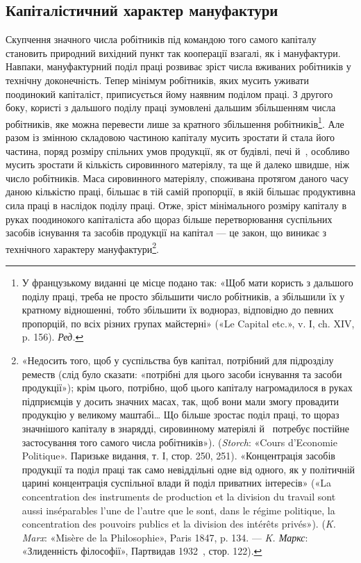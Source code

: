 \subsection{Капіталістичний характер мануфактури}

Скупчення значного числа робітників під командою того
самого капіталу становить природний вихідний пункт так кооперації
взагалі, як і мануфактури. Навпаки, мануфактурний поділ
праці розвиває зріст числа вживаних робітників у технічну
доконечність. Тепер мінімум робітників, яких мусить уживати
поодинокий капіталіст, приписується йому наявним поділом
праці. З другого боку, користі з дальшого поділу праці зумовлені
дальшим збільшенням числа робітників, яке можна перевести
лише за кратного збільшення робітників\footnote*{
У французькому виданні це місце подано так: «Щоб мати користь
з дальшого поділу праці, треба не просто збільшити число робітників, а
збільшили їх у кратному відношенні, тобто збільшити їх воднораз,
відповідно до певних пропорцій, по всіх різних групах майстерні» («Le
Capital etc.», v. І, ch. XIV, p. 156). \emph{Ред.}
}. Але разом із
змінною складовою частиною капіталу мусить зростати й стала
його частина, поряд розміру спільних умов продукції, як от
будівлі, печі й~, особливо мусить зростати й кількість сировинного
матеріялу, та ще й далеко швидше, ніж число робітників.
Маса сировинного матеріялу, споживана протягом даного
часу даною кількістю праці, більшає в тій самій пропорції, в
якій більшає продуктивна сила праці в наслідок поділу праці.
Отже, зріст мінімального розміру капіталу в руках поодинокого
капіталіста або щораз більше перетворювання суспільних засобів
існування та засобів продукції на капітал — це закон, що
виникає з технічного характеру мануфактури\footnote{
«Недосить того, щоб у суспільства був капітал, потрібний для
підрозділу реместв (слід було сказати: «потрібні для цього засоби
існування та засоби продукції»); крім цього, потрібно, щоб цього капіталу
нагромадилося в руках підприємців у досить значних масах, так, щоб
вони мали змогу провадити продукцію у великому маштабі\dots{} Що більше
зростає поділ праці, то щораз значнішого капіталу в знарядді,
сировинному матеріялі й~ потребує постійне застосування того самого числа
робітників»). (\emph{Storch}: «Cours d’Economie Politique». Паризьке видання,
т. І, стор. 250, 251). «Концентрація засобів продукції та поділ
праці так само невіддільні одне від одного, як у політичній царині
концентрація суспільної влади й поділ приватних інтересів» («La
concentration des instruments de production et la division du travail sont aussi
inséparables l’une de l’autre que le sont, dans le régime politique, la
concentration des pouvoirs publics et la division des intérêts privés»).
(\emph{K. Marx}: «Misère de la Philosophie», Paris 1847, p. 134. — \emph{K. Маркс}:
«Злиденність філософії», Партвидав 1932~, стор. 122).
}.

